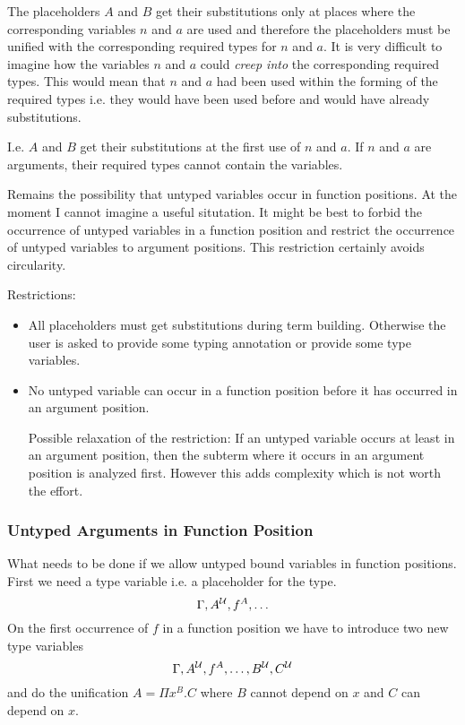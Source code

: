 The placeholders $A$ and $B$ get their substitutions only at places where the
corresponding variables $n$ and $a$ are used and therefore the placeholders
must be unified with the corresponding required types for $n$ and $a$. It is
very difficult to imagine how the variables $n$ and $a$ could \emph{creep
  into} the corresponding required types. This would mean that $n$ and $a$ had
been used within the forming of the required types i.e. they would have been
used before and would have already substitutions.

I.e. $A$ and $B$ get their substitutions at the first use of $n$ and $a$. If
$n$ and $a$ are arguments, their required types cannot contain the variables.

Remains the possibility that untyped variables occur in function positions. At
the moment I cannot imagine a useful situtation. It might be best to forbid
the occurrence of untyped variables in a function position and restrict the
occurrence of untyped variables to argument positions. This restriction
certainly avoids circularity.


\noindent Restrictions:
\begin{itemize}

\item All placeholders must get substitutions during term building. Otherwise
  the user is asked to provide some typing annotation or provide some type
  variables.

\item No untyped variable can occur in a function position before it has
  occurred in an argument position.

  Possible relaxation of the restriction: If an untyped variable occurs at
  least in an argument position, then the subterm where it occurs in an
  argument position is analyzed first. However this adds complexity which is
  not worth the effort.
\end{itemize}



\subsubsection{Untyped Arguments in Function Position}

What needs to be done if we allow untyped bound variables in function
positions. First we need a type variable i.e. a placeholder for the type.
$$
\Gamma, A^{\cal{U}}, f^A, \ldots
$$
On the first occurrence of $f$ in a function position we have to introduce two
new type variables
$$
\Gamma, A^{\cal{U}}, f^A, \ldots, B^{\cal{U}}, C^{\cal{U}}
$$
and do the unification $ A = \Pi x^B. C$ where $B$ cannot depend on $x$ and
$C$ can depend on $x$.

